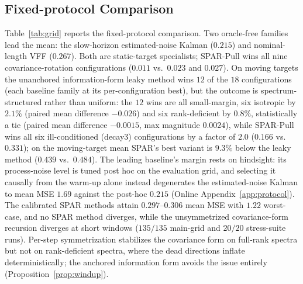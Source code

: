 \documentclass[twoside,11pt]{article}
\begin{document}
\subsection{Fixed-protocol Comparison}
Table~\ref{tab:grid} reports the fixed-protocol comparison.
Two oracle-free families lead the mean: the slow-horizon estimated-noise Kalman ($0.215$) and nominal-length VFF ($0.267$).
Both are static-target specialists; SPAR-Pull wins all nine covariance-rotation configurations ($0.011$ vs.\ $0.023$ and $0.027$).
On moving targets the unanchored information-form leaky method wins $12$ of the $18$ configurations (each baseline family at its per-configuration best), but the outcome is spectrum-structured rather than uniform: the $12$ wins are all small-margin, six isotropic by $2.1\%$ (paired mean difference $-0.026$) and six rank-deficient by $0.8\%$, statistically a tie (paired mean difference $-0.0015$, max magnitude $0.0024$), while SPAR-Pull wins all six ill-conditioned (decay3) configurations by a factor of $2.0$ ($0.166$ vs.\ $0.331$); on the moving-target mean SPAR's best variant is $9.3\%$ below the leaky method ($0.439$ vs.\ $0.484$).
The leading baseline's margin rests on hindsight: its process-noise level is tuned post hoc on the evaluation grid, and selecting it causally from the warm-up alone instead degenerates the estimated-noise Kalman to mean MSE $1.69$ against the post-hoc $0.215$ (Online Appendix~\ref{app:protocol}).
The calibrated SPAR methods attain $0.297$--$0.306$ mean MSE with $1.22$ worst-case, and no SPAR method diverges, while the unsymmetrized covariance-form recursion diverges at short windows ($135/135$ main-grid and $20/20$ stress-suite runs).
Per-step symmetrization stabilizes the covariance form on full-rank spectra \citep{bierman1977,sayed2008} but not on rank-deficient spectra, where the dead directions inflate deterministically; the anchored information form avoids the issue entirely (Proposition~\ref{prop:windup}).
\end{document}
